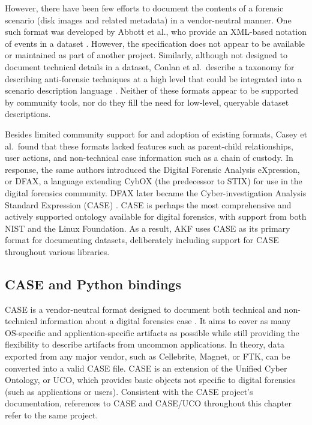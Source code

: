 \documentclass[letterpaper,12pt]{report}
\begin{document}
However, there have been few efforts to document the contents of a
forensic scenario (disk images and related metadata) in a vendor-neutral
manner. One such format was developed by Abbott et al., who provide an
XML-based notation of events in a dataset
\cite{abbottAutomatedRecognitionEvent2006}. However, the
specification does not appear to be available or maintained as part of
another project. Similarly, although not designed to document technical
details in a dataset, Conlan et al.~describe a taxonomy for describing
anti-forensic techniques at a high level that could be integrated into a
scenario description language
\cite{conlanAntiforensicsFurtheringDigital2016}. Neither of these
formats appear to be supported by community tools, nor do they fill the
need for low-level, queryable dataset descriptions.

Besides limited community support for and adoption of existing formats,
Casey et al.~found that these formats lacked features such as
parent-child relationships, user actions, and non-technical case
information such as a chain of custody. In response, the same authors
introduced the Digital Forensic Analysis eXpression, or DFAX, a language
extending CybOX (the predecessor to STIX) for use in the digital
forensics community. DFAX later became the Cyber-investigation Analysis
Standard Expression (CASE)
\cite{caseyAdvancingCoordinatedCyberinvestigations2017}. CASE is
perhaps the most comprehensive and actively supported ontology available
for digital forensics, with support from both NIST and the Linux
Foundation. As a result, AKF uses CASE as its primary format for
documenting datasets, deliberately including support for CASE throughout
various libraries.

\subsection{CASE and Python
bindings}\label{case-and-python-bindings}

CASE is a vendor-neutral format designed to document both technical and
non-technical information about a digital forensics case
\cite{caseyAdvancingCoordinatedCyberinvestigations2017}. It aims to
cover as many OS-specific and application-specific artifacts as possible
while still providing the flexibility to describe artifacts from
uncommon applications. In theory, data exported from any major vendor,
such as Cellebrite, Magnet, or FTK, can be converted into a valid CASE
file. CASE is an extension of the Unified Cyber Ontology, or UCO, which
provides basic objects not specific to digital forensics (such as
applications or users). Consistent with the CASE project's
documentation, references to CASE and CASE/UCO throughout this chapter
refer to the same project.
\end{document}
